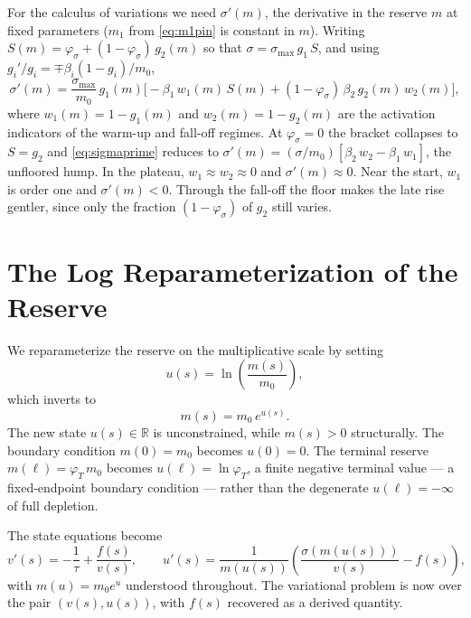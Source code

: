 \documentclass[11pt]{article}
\begin{document}
For the calculus of variations we need $\sigma'(m)$, the derivative in the reserve $m$ at fixed parameters ($m_1$ from \eqref{eq:m1pin} is constant in $m$). Writing $S(m) = \varphi_\sigma + (1 - \varphi_\sigma)\,g_2(m)$ so that $\sigma = \sigma_{\max}\,g_1\,S$, and using $g_i'/g_i = \mp\beta_i(1 - g_i)/m_0$,
\begin{equation}\label{eq:sigmaprime}
\sigma'(m) = \frac{\sigma_{\max}}{m_0}\,g_1(m)\bigl[-\beta_1\,w_1(m)\,S(m) + (1 - \varphi_\sigma)\,\beta_2\,g_2(m)\,w_2(m)\bigr],
\end{equation}
where $w_1(m) = 1 - g_1(m)$ and $w_2(m) = 1 - g_2(m)$ are the activation indicators of the warm-up and fall-off regimes. At $\varphi_\sigma = 0$ the bracket collapses to $S = g_2$ and \eqref{eq:sigmaprime} reduces to $\sigma'(m) = (\sigma/m_0)[\beta_2\,w_2 - \beta_1\,w_1]$, the unfloored hump. In the plateau, $w_1 \approx w_2 \approx 0$ and $\sigma'(m) \approx 0$. Near the start, $w_1$ is order one and $\sigma'(m) < 0$. Through the fall-off the floor makes the late rise gentler, since only the fraction $(1 - \varphi_\sigma)$ of $g_2$ still varies.

\section{The Log Reparameterization of the Reserve}

We reparameterize the reserve on the multiplicative scale by setting
\begin{equation}
u(s) = \ln\!\left(\frac{m(s)}{m_0}\right),
\end{equation}
which inverts to
\begin{equation}
m(s) = m_0\, e^{u(s)}.
\end{equation}
The new state $u(s) \in \mathbb{R}$ is unconstrained, while $m(s) > 0$ structurally. The boundary condition $m(0) = m_0$ becomes $u(0) = 0$. The terminal reserve $m(\ell) = \varphi_T\, m_0$ becomes $u(\ell) = \ln \varphi_T$, a finite negative terminal value --- a fixed-endpoint boundary condition --- rather than the degenerate $u(\ell) = -\infty$ of full depletion.

The state equations become
\begin{equation}\label{eq:state}
v'(s) = -\frac{1}{\tau} + \frac{f(s)}{v(s)}, \qquad u'(s) = \frac{1}{m(u(s))}\left(\frac{\sigma(m(u(s)))}{v(s)} - f(s)\right),
\end{equation}
with $m(u) = m_0 e^u$ understood throughout. The variational problem is now over the pair $(v(s), u(s))$, with $f(s)$ recovered as a derived quantity.
\end{document}
